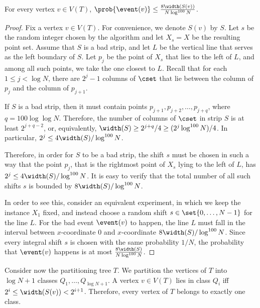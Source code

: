 \documentclass{toc}
\begin{document}
%
	
%
%

\begin{claim}\label{claim: prob bad strip}
For every vertex $v\in V(T)$, $\prob{\event(v)}\leq \frac{8\width(S(v))}{N\log^{100} N}$.
\end{claim}

\begin{proof}
	Fix a vertex $v\in V(T)$.
	For convenience, we denote $S(v)$ by $S$. Let $s$ be the random integer chosen by the algorithm and let $X_s=X$ be the resulting point set.
	Assume that $S$ is a bad strip, and let $L$ be the vertical line that serves as the left boundary of $S$. Let $p_j$ be the point of $X_s$ that lies to the left of $L$, and among all such points, we take the one closest to $L$. Recall that for each $1\leq j< \log N$, there are $2^j-1$ columns of $\cset$ that lie between the column of $p_j$ and the column of $p_{j+1}$. %
	
	If $S$ is a bad strip, then it must contain points $p_{j+1},p_{j+2},\ldots,p_{j+q}$, where $q= 100\log\log N$. Therefore, the number of columns of $\cset$ in strip $S$ is at least $2^{j+q-2}$, or, equivalently, $\width(S)\geq 2^{j+q}/4\geq (2^j\log^{100}N)/4$. In particular, $2^j\leq 4\width(S)/\log^{100}N$. 
	
	Therefore, in order for $S$ to be a bad strip, the shift $s$ must be chosen in such a way that the point $p_j$, that is the rightmost point of $X_s$ lying to the left of $L$, has $2^j\leq 4\width(S)/\log^{100}N$. It is easy to verify that the total number of all such shifts $s$ is bounded by $8\width(S)/\log^{100}N$.
	
	In order to see this, consider an equivalent experiment, in which we keep the instance $X_1$ fixed, and instead choose a random shift $s\in \set{0,\ldots,N-1}$ for the line $L$. For the bad event $\event(v)$ to happen, the line $L$ must fall in the interval between $x$-coordinate $0$ and $x$-coordinate $8\width(S)/\log^{100}N$. Since every integral shift $s$ is chosen with the same probability $1/N$, the probability that $\event(v)$ happens is at most $\frac{8\width(S)}{N\log^{100} N}$.
\end{proof}


Consider now the partitioning tree $T$. We partition the vertices of $T$ into $\log N+1$ classes $Q_1,\ldots,Q_{\log N+1}$. A vertex $v\in V(T)$ lies in class $Q_i$ iff $2^i\leq \width(S(v))< 2^{i+1}$. Therefore, every vertex of $T$ belongs to exactly one class.
\end{document}
